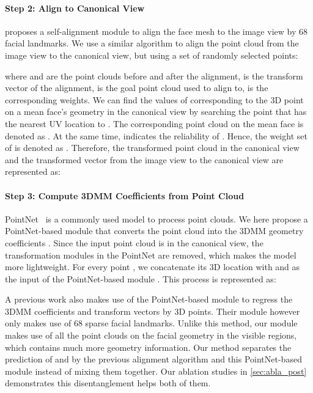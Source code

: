 \documentclass[10pt,twocolumn,letterpaper]{article}
\begin{document}
\paragraph{Step 2: Align to Canonical View} 
\cite{ruan2021sadrnet} proposes a self-alignment module to align the face mesh to the image view by 68 facial landmarks. We use a similar algorithm  to align the point cloud from the image view to the canonical view, but using a set of randomly selected points:

where  and  are the point clouds before and after the alignment,  is the transform vector of the alignment,  is the goal point cloud used to align to,  is the corresponding weights.
We can find the values of  corresponding to the  3D point  on a mean face's geometry in the canonical view by searching the point that has the nearest UV location to . 
The corresponding point cloud on the mean face is denoted as . At the same time,  indicates the reliability of . 
Hence, the weight set of  is denoted as . Therefore, the transformed point cloud in the canonical view  and the transformed vector from the image view to the canonical view  are represented as:



\paragraph{Step 3: Compute  3DMM Coefficients from Point Cloud} 
PointNet~\cite{qi2017pointnet} is a commonly used model to process point clouds. 
We here propose a PointNet-based module that converts the point cloud into the 3DMM geometry coefficients . 
Since the input point cloud  is in the canonical view, the transformation modules in the PointNet are removed, which makes the model more lightweight. 
For every point , we concatenate its 3D location with  and  as the input of the PointNet-based module . This process is represented as:


A previous work \cite{wu2021synergy} also makes use of the  PointNet-based module to regress the 3DMM coefficients and transform vectors by 3D points. 
Their module however only makes use of 68 sparse facial landmarks. 
Unlike this method, our module makes use of all the point clouds on the facial geometry in the visible regions, which contains much more geometry information. 
Our method separates the prediction of  and  by the previous alignment algorithm and this PointNet-based module instead of mixing them together. Our ablation studies in \cref{sec:abla_post} demonstrates this disentanglement helps both of them.
\end{document}
